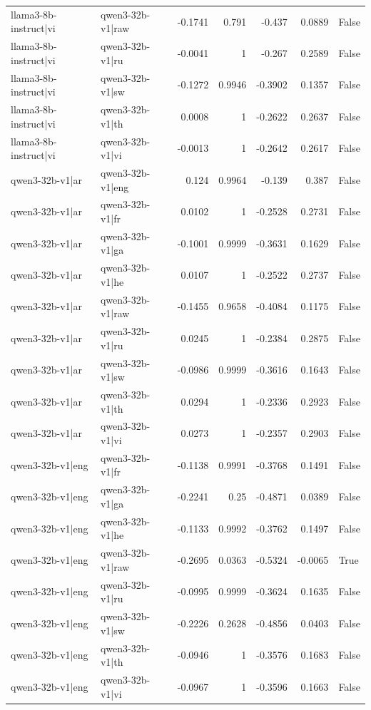 \begin{table}
\begin{tabular}{l l r r r r l}
llama3-8b-instruct|vi & qwen3-32b-v1|raw & -0.1741 & 0.791 & -0.437 & 0.0889 & False \\
llama3-8b-instruct|vi & qwen3-32b-v1|ru & -0.0041 & 1 & -0.267 & 0.2589 & False \\
llama3-8b-instruct|vi & qwen3-32b-v1|sw & -0.1272 & 0.9946 & -0.3902 & 0.1357 & False \\
llama3-8b-instruct|vi & qwen3-32b-v1|th & 0.0008 & 1 & -0.2622 & 0.2637 & False \\
llama3-8b-instruct|vi & qwen3-32b-v1|vi & -0.0013 & 1 & -0.2642 & 0.2617 & False \\
qwen3-32b-v1|ar & qwen3-32b-v1|eng & 0.124 & 0.9964 & -0.139 & 0.387 & False \\
qwen3-32b-v1|ar & qwen3-32b-v1|fr & 0.0102 & 1 & -0.2528 & 0.2731 & False \\
qwen3-32b-v1|ar & qwen3-32b-v1|ga & -0.1001 & 0.9999 & -0.3631 & 0.1629 & False \\
qwen3-32b-v1|ar & qwen3-32b-v1|he & 0.0107 & 1 & -0.2522 & 0.2737 & False \\
qwen3-32b-v1|ar & qwen3-32b-v1|raw & -0.1455 & 0.9658 & -0.4084 & 0.1175 & False \\
qwen3-32b-v1|ar & qwen3-32b-v1|ru & 0.0245 & 1 & -0.2384 & 0.2875 & False \\
qwen3-32b-v1|ar & qwen3-32b-v1|sw & -0.0986 & 0.9999 & -0.3616 & 0.1643 & False \\
qwen3-32b-v1|ar & qwen3-32b-v1|th & 0.0294 & 1 & -0.2336 & 0.2923 & False \\
qwen3-32b-v1|ar & qwen3-32b-v1|vi & 0.0273 & 1 & -0.2357 & 0.2903 & False \\
qwen3-32b-v1|eng & qwen3-32b-v1|fr & -0.1138 & 0.9991 & -0.3768 & 0.1491 & False \\
qwen3-32b-v1|eng & qwen3-32b-v1|ga & -0.2241 & 0.25 & -0.4871 & 0.0389 & False \\
qwen3-32b-v1|eng & qwen3-32b-v1|he & -0.1133 & 0.9992 & -0.3762 & 0.1497 & False \\
qwen3-32b-v1|eng & qwen3-32b-v1|raw & -0.2695 & 0.0363 & -0.5324 & -0.0065 & True \\
qwen3-32b-v1|eng & qwen3-32b-v1|ru & -0.0995 & 0.9999 & -0.3624 & 0.1635 & False \\
qwen3-32b-v1|eng & qwen3-32b-v1|sw & -0.2226 & 0.2628 & -0.4856 & 0.0403 & False \\
qwen3-32b-v1|eng & qwen3-32b-v1|th & -0.0946 & 1 & -0.3576 & 0.1683 & False \\
qwen3-32b-v1|eng & qwen3-32b-v1|vi & -0.0967 & 1 & -0.3596 & 0.1663 & False \\

\end{tabular}
\end{table}
